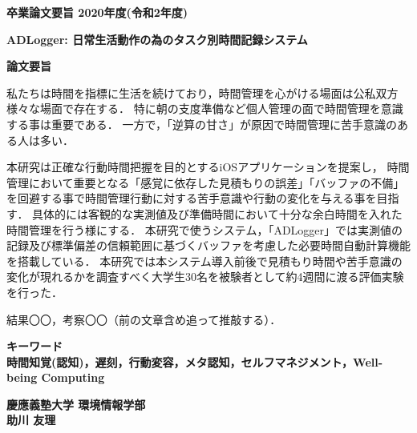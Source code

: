 \begin{center}
\textbf{\Large 卒業論文要旨 2020年度(令和2年度)}

\vspace{6.18mm}

\textbf{\Large ADLogger: 日常生活動作の為のタスク別時間記録システム}
\end{center}

\vspace{10mm}

\begin{flushleft}
\textbf{論文要旨}\\
\end{flushleft}

私たちは時間を指標に生活を続けており，時間管理を心がける場面は公私双方様々な場面で存在する．
特に朝の支度準備など個人管理の面で時間管理を意識する事は重要である．
一方で，「逆算の甘さ」が原因で時間管理に苦手意識のある人は多い．

本研究は正確な行動時間把握を目的とするiOSアプリケーションを提案し，
時間管理において重要となる「感覚に依存した見積もりの誤差」「バッファの不備」を回避する事で時間管理行動に対する苦手意識や行動の変化を与える事を目指す．
具体的には客観的な実測値及び準備時間において十分な余白時間を入れた時間管理を行う様にする．
本研究で使うシステム，「ADLogger」では実測値の記録及び標準偏差の信頼範囲に基づくバッファを考慮した必要時間自動計算機能を搭載している．
本研究では本システム導入前後で見積もり時間や苦手意識の変化が現れるかを調査すべく大学生30名を被験者として約4週間に渡る評価実験を行った．

結果〇〇，考察〇〇（前の文章含め追って推敲する）．

\begin{flushleft}
\textbf{キーワード}\\
\textbf{時間知覚(認知)，遅刻，行動変容，メタ認知，セルフマネジメント，Well-being Computing}

\end{flushleft}

\begin{flushright}
\textbf{慶應義塾大学 環境情報学部}\\
\textbf{助川 友理}
\end{flushright}
\newpage

